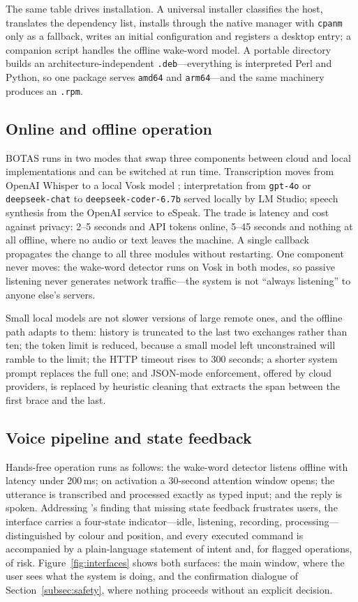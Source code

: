 \documentclass[10pt,a4paper]{article}
\begin{document}
The same table drives installation. A universal installer classifies the host, translates the dependency list, installs through the native manager with \texttt{cpanm} only as a fallback, writes an initial configuration and registers a desktop entry; a companion script handles the offline wake-word model. A portable directory builds an architecture-independent \texttt{.deb}---everything is interpreted Perl and Python, so one package serves \texttt{amd64} and \texttt{arm64}---and the same machinery produces an \texttt{.rpm}.

\subsection{Online and offline operation}
\label{subsec:modes}

BOTAS runs in two modes that swap three components between cloud and local implementations and can be switched at run time. Transcription moves from OpenAI Whisper to a local Vosk model \citep{Alphacep2023, Radford2022}; interpretation from \texttt{gpt-4o} or \texttt{deepseek-chat} to \texttt{deepseek-coder-6.7b} served locally by LM Studio; speech synthesis from the OpenAI service to eSpeak. The trade is latency and cost against privacy: 2--5 seconds and API tokens online, 5--45 seconds and nothing at all offline, where no audio or text leaves the machine. A single callback propagates the change to all three modules without restarting. One component never moves: the wake-word detector runs on Vosk in both modes, so passive listening never generates network traffic---the system is not ``always listening'' to anyone else's servers.

Small local models are not slower versions of large remote ones, and the offline path adapts to them: history is truncated to the last two exchanges rather than ten; the token limit is reduced, because a small model left unconstrained will ramble to the limit; the HTTP timeout rises to 300 seconds; a shorter system prompt replaces the full one; and JSON-mode enforcement, offered by cloud providers, is replaced by heuristic cleaning that extracts the span between the first brace and the last.

\subsection{Voice pipeline and state feedback}
\label{subsec:voice}

Hands-free operation runs as follows: the wake-word detector listens offline with latency under 200\,ms; on activation a 30-second attention window opens; the utterance is transcribed and processed exactly as typed input; and the reply is spoken. Addressing \citeauthor{Luger2016}'s \citeyearpar{Luger2016} finding that missing state feedback frustrates users, the interface carries a four-state indicator---idle, listening, recording, processing---distinguished by colour and position, and every executed command is accompanied by a plain-language statement of intent and, for flagged operations, of risk. Figure~\ref{fig:interfaces} shows both surfaces: the main window, where the user sees what the system is doing, and the confirmation dialogue of Section~\ref{subsec:safety}, where nothing proceeds without an explicit decision.
\end{document}
